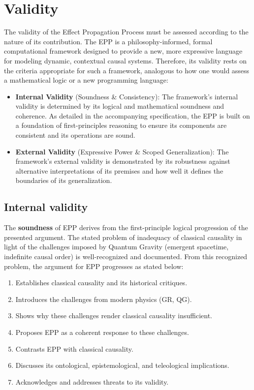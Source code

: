 \section{Validity}
\label{sec:validity}

The validity of the Effect Propagation Process must be assessed according to the nature of its contribution. The EPP is
a philosophy-informed, formal computational framework designed to provide a new, more expressive language for modeling
dynamic, contextual causal systems. Therefore, its validity rests on the criteria appropriate for such a framework,
analogous to how one would assess a mathematical logic or a new programming language:

\begin{itemize}
    \item \textbf{Internal Validity} (Soundness & Consistency): The framework's internal validity is determined by its logical and
  mathematical soundness and coherence. As detailed in the accompanying specification, the EPP is built on a foundation
  of first-principles reasoning to ensure its components are consistent and its operations are sound.
  \item \textbf{External Validity} (Expressive Power & Scoped Generalization): The framework's external validity is demonstrated by its
  robustness against alternative interpretations of its premises and how well it defines the boundaries of its
  generalization.
\end{itemize}


\subsection{Internal validity}
\label{sec:validity_internal}

The \textbf{soundness} of EPP derives from the first-principle logical progression of the presented argument. The stated problem of inadequacy of classical causality in light of the challenges imposed by Quantum Gravity (emergent spacetime, indefinite causal order) is well-recognized and documented\cite{MriniHardyIndefinite}.
From this recognized problem, the argument for EPP progresses as stated below:

\begin{enumerate}
    \item Establishes classical causality and its historical critiques.
    \item Introduces the challenges from modern physics (GR, QG).
    \item Shows why these challenges render classical causality insufficient.
    \item Proposes EPP as a coherent response to these challenges.
    \item Contrasts EPP with classical causality.
    \item Discusses its ontological, epistemological, and teleological implications.
    \item Acknowledges and addresses threats to its validity.
\end{enumerate}


